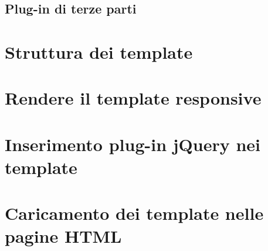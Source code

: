 \subsection{Plug-in di terze parti}\label{sec:packager}

\section{Struttura dei template}

\section{Rendere il template responsive}

\section{Inserimento plug-in jQuery nei template}

\section{Caricamento dei template nelle pagine HTML}

